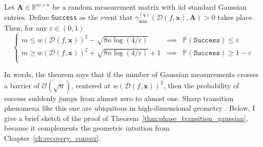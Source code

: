 \begin{theorem}
    \label{thm:phase_transition_gaussian}
    Let $\mathbf{A} \in \mathbb{R}^{m \times n}$ be a random measurement matrix with \acrshort{iid} standard Gaussian entries. Define \texttt{Success} as the event that $\gamma_{\min}^{(q)} \left ( \mathcal{D}( f, \mathbf{x}), \mathbf{A} \right ) > 0$ takes place. Then, for any $\varepsilon \in (0, 1)$
    \begin{equation}
        \left \{
        \begin{matrix}
        m \leq w(\mathcal{D}(f, \mathbf{x}))^2 - \sqrt{8 n \log (4 / \varepsilon)} & \implies & \mathbb{P} \left ( \texttt{Success} \right ) \leq \varepsilon \\
        m \geq w(\mathcal{D}(f, \mathbf{x}))^2 + \sqrt{8 n \log (4/\varepsilon)} + 1 & \implies & \mathbb{P} \left ( \texttt{Success} \right ) \geq 1 - \varepsilon \\
        \end{matrix}
        \right.
    \end{equation}
\end{theorem}

In words, the theorem says that if the number of Gaussian measurements crosses a barrier of $\mathcal{O} \left( \sqrt{n} \right)$, centered at $w(\mathcal{D}(f, \mathbf{x}))^2$, then the probability of success suddenly jumps from almost zero to almost one. Sharp transition phenomena like this one are ubiquitous in high-dimensional geometry \cite{donoho2009a,oymak2018}. Below, I give a brief sketch of the proof of Theorem~\ref{thm:phase_transition_gaussian}, because it complements the geometric intuition from Chapter~\ref{ch:recovery_convex}.

\clearpage

